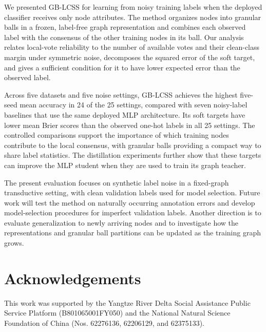 \documentclass[a4paper,fleqn]{cas-sc}
\theoremstyle{definition}
\theoremstyle{plain}
\begin{document}
We presented GB-LCSS for learning from noisy training labels when the deployed classifier receives only node attributes. The method organizes nodes into granular balls in a frozen, label-free graph representation and combines each observed label with the consensus of the other training nodes in its ball. Our analysis relates local-vote reliability to the number of available votes and their clean-class margin under symmetric noise, decomposes the squared error of the soft target, and gives a sufficient condition for it to have lower expected error than the observed label.

Across five datasets and five noise settings, GB-LCSS achieves the highest five-seed mean accuracy in 24 of the 25 settings, compared with seven noisy-label baselines that use the same deployed MLP architecture. Its soft targets have lower mean Brier scores than the observed one-hot labels in all 25 settings. The controlled comparisons support the importance of which training nodes contribute to the local consensus, with granular balls providing a compact way to share label statistics. The distillation experiments further show that these targets can improve the MLP student when they are used to train its graph teacher.

The present evaluation focuses on synthetic label noise in a fixed-graph transductive setting, with clean validation labels used for model selection. Future work will test the method on naturally occurring annotation errors and develop model-selection procedures for imperfect validation labels. Another direction is to evaluate generalization to newly arriving nodes and to investigate how the representations and granular ball partitions can be updated as the training graph grows.
\section*{Acknowledgements}

This work was supported by the Yangtze River Delta Social Assistance Public Service Platform (B801065001FY050) and the National Natural Science Foundation of China (Nos. 62276136, 62206129, and 62375133).

\setlength{\bibsep}{0.5pt plus 0.2pt minus 0.2pt}



\end{document}
